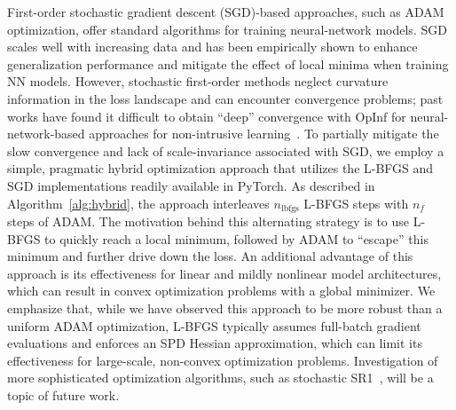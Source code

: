 \documentclass[3p,computermodern,11pt]{elsarticle}
\numberwithin{equation}{section}
\newcommand{\nBfgsSteps}{n_{\mathrm{lbfgs}}}
\begin{document}
First-order stochastic gradient descent (SGD)-based approaches, such as ADAM optimization, offer standard algorithms for training neural-network models. SGD scales well with increasing data and has been empirically shown to enhance generalization performance and mitigate the effect of local minima when training NN models. 
However, 
stochastic first-order methods
neglect curvature information in the loss landscape and 
can encounter convergence problems;
past works have found it difficult to obtain ``deep'' convergence with OpInf for neural-network-based approaches for non-intrusive learning~\cite{GaWaZh20}. 
To partially mitigate the slow convergence and lack of scale-invariance associated with SGD, we employ a simple, pragmatic hybrid optimization approach that utilizes the L-BFGS and SGD implementations
readily available in PyTorch. As described in Algorithm~\ref{alg:hybrid}, the approach interleaves $\nBfgsSteps$ L-BFGS steps with $n_f$ steps of ADAM.
The motivation behind this alternating strategy 
is to use L-BFGS to quickly reach a local minimum, followed by ADAM to ``escape'' this minimum and
further drive down the loss. An additional advantage of this approach is its effectiveness for linear and mildly nonlinear model architectures, which can result in convex optimization problems with a global minimizer. We emphasize that, while we have observed this approach to be more robust than a uniform ADAM optimization, L-BFGS typically assumes full-batch gradient evaluations and enforces an SPD Hessian approximation, which can limit its effectiveness for large-scale, non-convex optimization problems. Investigation of more sophisticated optimization algorithms, such as stochastic SR1~\cite{LiLiDe26}, will be a topic of future work. 
\end{document}
